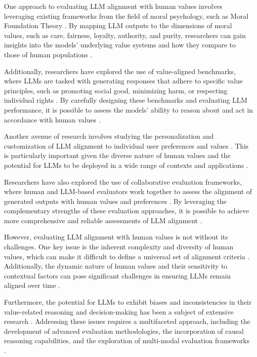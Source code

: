 \documentclass[11pt]{article}
\begin{document}
One approach to evaluating LLM alignment with human values involves leveraging existing frameworks from the field of moral psychology, such as Moral Foundation Theory \cite{ref160}. By mapping LLM outputs to the dimensions of moral values, such as care, fairness, loyalty, authority, and purity, researchers can gain insights into the models' underlying value systems and how they compare to those of human populations \cite{ref161}.

Additionally, researchers have explored the use of value-aligned benchmarks, where LLMs are tasked with generating responses that adhere to specific value principles, such as promoting social good, minimizing harm, or respecting individual rights \cite{ref162}. By carefully designing these benchmarks and evaluating LLM performance, it is possible to assess the models' ability to reason about and act in accordance with human values \cite{ref159}.

Another avenue of research involves studying the personalization and customization of LLM alignment to individual user preferences and values \cite{ref163}. This is particularly important given the diverse nature of human values and the potential for LLMs to be deployed in a wide range of contexts and applications \cite{ref164}.

Researchers have also explored the use of collaborative evaluation frameworks, where human and LLM-based evaluators work together to assess the alignment of generated outputs with human values and preferences \cite{ref78}. By leveraging the complementary strengths of these evaluation approaches, it is possible to achieve more comprehensive and reliable assessments of LLM alignment \cite{ref165}.

However, evaluating LLM alignment with human values is not without its challenges. One key issue is the inherent complexity and diversity of human values, which can make it difficult to define a universal set of alignment criteria \cite{ref166}. Additionally, the dynamic nature of human values and their sensitivity to contextual factors can pose significant challenges in ensuring LLMs remain aligned over time \cite{ref167}.

Furthermore, the potential for LLMs to exhibit biases and inconsistencies in their value-related reasoning and decision-making has been a subject of extensive research \cite{ref168}. Addressing these issues requires a multifaceted approach, including the development of advanced evaluation methodologies, the incorporation of causal reasoning capabilities, and the exploration of multi-modal evaluation frameworks \cite{ref169,ref140}.
\end{document}
